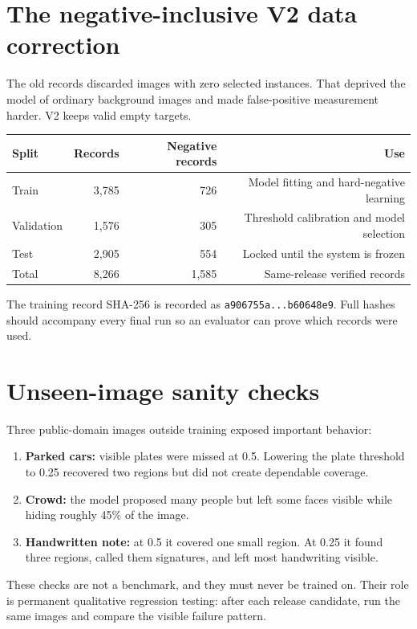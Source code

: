 \section{The negative-inclusive V2 data correction}

The old records discarded images with zero selected instances. That deprived the model of ordinary background images and made false-positive measurement harder. V2 keeps valid empty targets.

\begin{tabular}{@{}lrrr@{}}
\toprule
\textbf{Split} & \textbf{Records} & \textbf{Negative records} & \textbf{Use} \\
\midrule
Train & 3,785 & 726 & Model fitting and hard-negative learning \\
Validation & 1,576 & 305 & Threshold calibration and model selection \\
Test & 2,905 & 554 & Locked until the system is frozen \\
\midrule
Total & 8,266 & 1,585 & Same-release verified records \\
\bottomrule
\end{tabular}

The training record SHA-256 is recorded as \texttt{a906755a...b60648e9}. Full hashes should accompany every final run so an evaluator can prove which records were used.

\section{Unseen-image sanity checks}

Three public-domain images outside training exposed important behavior:

\begin{enumerate}[leftmargin=7mm]
  \item \textbf{Parked cars:} visible plates were missed at 0.5. Lowering the plate threshold to 0.25 recovered two regions but did not create dependable coverage.
  \item \textbf{Crowd:} the model proposed many people but left some faces visible while hiding roughly 45\% of the image.
  \item \textbf{Handwritten note:} at 0.5 it covered one small region. At 0.25 it found three regions, called them signatures, and left most handwriting visible.
\end{enumerate}

These checks are not a benchmark, and they must never be trained on. Their role is permanent qualitative regression testing: after each release candidate, run the same images and compare the visible failure pattern.

